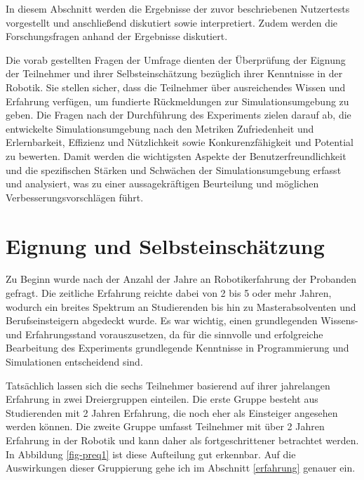 \documentclass[german,version-2020-11]{uzl-thesis}
\begin{document}
In diesem Abschnitt werden die Ergebnisse der zuvor beschriebenen Nutzertests vorgestellt und anschließend diskutiert sowie interpretiert. 
Zudem werden die Forschungsfragen anhand der Ergebnisse diskutiert.

Die vorab gestellten Fragen der Umfrage dienten der Überprüfung der Eignung der Teilnehmer und ihrer Selbsteinschätzung bezüglich ihrer Kenntnisse in der Robotik. 
Sie stellen sicher, dass die Teilnehmer über ausreichendes Wissen und Erfahrung verfügen, um fundierte Rückmeldungen zur Simulationsumgebung zu geben.
Die Fragen nach der Durchführung des Experiments zielen darauf ab, die entwickelte Simulationsumgebung nach den Metriken Zufriedenheit und Erlernbarkeit, 
Effizienz und Nützlichkeit sowie Konkurenzfähigkeit und Potential zu bewerten.
Damit werden die wichtigsten Aspekte der Benutzerfreundlichkeit und die spezifischen Stärken und Schwächen der Simulationsumgebung erfasst und analysiert, 
was zu einer aussagekräftigen Beurteilung und möglichen Verbesserungsvorschlägen führt.




\section{Eignung und Selbsteinschätzung}
  Zu Beginn wurde nach der Anzahl der Jahre an Robotikerfahrung der Probanden gefragt. 
  Die zeitliche Erfahrung reichte dabei von 2 bis 5 oder mehr Jahren, wodurch ein breites Spektrum an Studierenden bis hin zu Masterabsolventen und 
  Berufseinsteigern abgedeckt wurde. 
  Es war wichtig, einen grundlegenden Wissens- und Erfahrungsstand vorauszusetzen, da für die sinnvolle und erfolgreiche Bearbeitung des Experiments grundlegende 
  Kenntnisse in Programmierung und Simulationen entscheidend sind.

  Tatsächlich lassen sich die sechs Teilnehmer basierend auf ihrer jahrelangen Erfahrung in zwei Dreiergruppen einteilen. 
  Die erste Gruppe besteht aus Studierenden mit 2 Jahren Erfahrung, die noch eher als Einsteiger angesehen werden können. 
  Die zweite Gruppe umfasst Teilnehmer mit über 2 Jahren Erfahrung in der Robotik und kann daher als fortgeschrittener betrachtet werden.
  In Abbildung \vref{fig-preq1} ist diese Aufteilung gut erkennbar. Auf die Auswirkungen dieser Gruppierung gehe ich im Abschnitt \ref{erfahrung} genauer ein.
  
\end{document}
